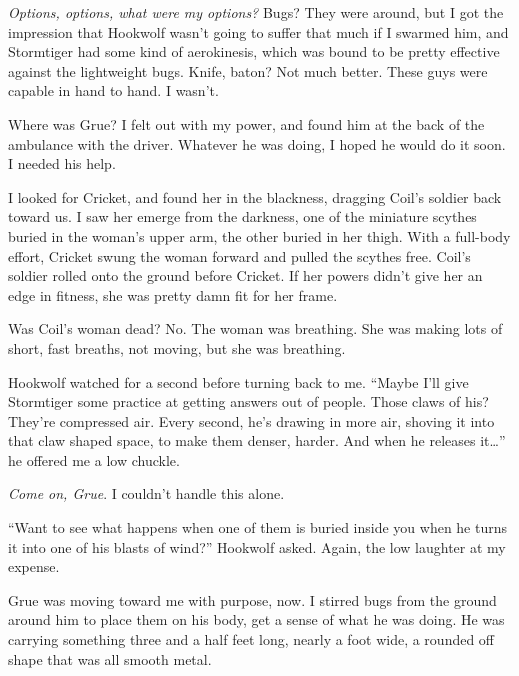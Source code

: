 \emph{Options, options, what were my options?}  Bugs?  They were around, but I got the impression that Hookwolf wasn't going to suffer that much if I swarmed him, and Stormtiger had some kind of aerokinesis, which was bound to be pretty effective against the lightweight bugs.  Knife, baton?  Not much better.   These guys were capable in hand to hand.  I wasn't.



Where was Grue?  I felt out with my power, and found him at the back of the ambulance with the driver.  Whatever he was doing, I hoped he would do it soon.  I needed his help.



I looked for Cricket, and found her in the blackness, dragging Coil's soldier back toward us.  I saw her emerge from the darkness, one of the miniature scythes buried in the woman's upper arm, the other buried in her thigh.  With a full-body effort, Cricket swung the woman forward and pulled the scythes free.  Coil's soldier rolled onto the ground before Cricket.  If her powers didn't give her an edge in fitness, she was pretty damn fit for her frame.



Was Coil's woman dead?  No.  The woman was breathing.  She was making lots of short, fast breaths, not moving, but she was breathing.



Hookwolf watched for a second before turning back to me.  ``Maybe I'll give Stormtiger some practice at getting answers out of people.  Those claws of his?  They're compressed air.  Every second, he's drawing in more air, shoving it into that claw shaped space, to make them denser, harder.  And when he releases it\ldots'' he offered me a low chuckle.



\emph{Come on, Grue}.  I couldn't handle this alone.



``Want to see what happens when one of them is buried inside you when he turns it into one of his blasts of wind?''  Hookwolf asked.  Again, the low laughter at my expense.



Grue was moving toward me with purpose, now.  I stirred bugs from the ground around him to place them on his body, get a sense of what he was doing.  He was carrying something three and a half feet long, nearly a foot wide, a rounded off shape that was all smooth metal.



